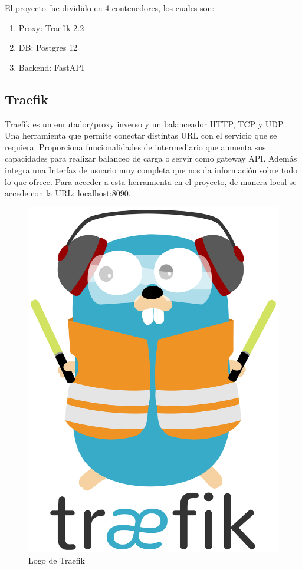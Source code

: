 El proyecto fue dividido en 4 contenedores, los cuales son:
\begin{enumerate}
    \item Proxy: Traefik 2.2
    \item DB: Postgres 12
    \item Backend: FastAPI
\end{enumerate}

\subsection{Traefik}
Traefik es un enrutador/proxy inverso y un balanceador HTTP, TCP y UDP. Una herramienta que permite conectar distintas URL con el servicio que se requiera. Proporciona funcionalidades de intermediario que aumenta sus capacidades para realizar balanceo de carga o servir como gateway API. Además integra una Interfaz de usuario muy completa que nos da información sobre todo lo que ofrece. Para acceder a esta herramienta en el proyecto, de manera local se accede con la URL: localhost:8090.

\begin{figure}[!htb]
    \centering
    \includegraphics[scale=0.1]{TT/img/implementacion/Traefik.logo.png}
    \caption{Logo de Traefik}
    \label{graphic:TraefikLogo}    
\end{figure}

